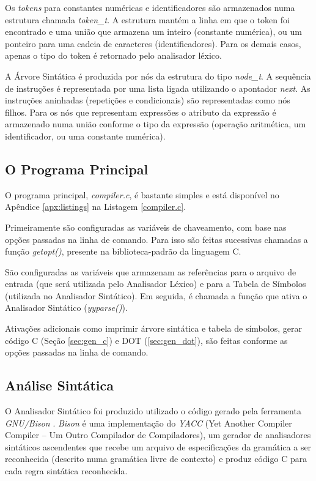 Os \emph{tokens} para constantes numéricas e identificadores são armazenados
numa estrutura chamada \emph{token\_t}. A estrutura mantém a linha em que o token
foi encontrado e uma união que armazena um inteiro (constante numérica), ou um
ponteiro para uma cadeia de caracteres (identificadores). Para os demais
casos, apenas o tipo do token é retornado pelo analisador léxico.

A Árvore Sintática é produzida por nós da estrutura do tipo \emph{node\_t}. A
sequência de instruções é representada por uma lista ligada utilizando o
apontador \emph{next}. As instruções aninhadas (repetições e condicionais) são
representadas como nós filhos. Para os nós que representam expressões o
atributo da expressão é armazenado numa união conforme o tipo da expressão
(operação aritmética, um identificador, ou uma constante numérica).

\subsection{O Programa Principal}
O programa principal, \emph{compiler.c}, é bastante simples e está disponível
no Apêndice \ref{apx:listings} na Listagem \ref{compiler.c}.

Primeiramente são configuradas as variáveis de chaveamento, com base nas opções
passadas na linha de comando. Para isso são feitas sucessivas chamadas a
função \emph{getopt()}, presente na biblioteca-padrão da linguagem C.

São configuradas as variáveis que armazenam as referências para o arquivo de
entrada (que será utilizada pelo Analisador Léxico) e para a Tabela de
Símbolos (utilizada no Analisador Sintático). Em seguida, é chamada a função
que ativa o Analisador Sintático (\emph{yyparse()}).

Ativações adicionais como imprimir árvore sintática e tabela de símbolos,
gerar código C (Seção \ref{sec:gen_c}) e DOT (\ref{sec:gen_dot}), são feitas
conforme as opções passadas na linha de comando.


\subsection{Análise Sintática}
O Analisador Sintático foi produzido utilizado o código gerado pela ferramenta
\emph{GNU/Bison} \cite{bison}. \emph{Bison} é uma implementação do \emph{YACC}
(Yet Another Compiler Compiler {--} Um Outro Compilador de Compiladores), um
gerador de analisadores sintáticos ascendentes que recebe um arquivo de
especificações da gramática a ser reconhecida (descrito numa gramática livre
de contexto) e produz código C para cada regra sintática reconhecida.

